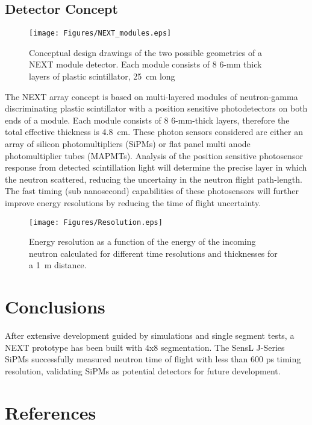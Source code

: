 \documentclass[preprint,3p,twocolumn]{elsarticle}
\begin{document}
\subsection{Detector Concept}

\begin{figure}[tp]
\centering
\texttt{[image: Figures/NEXT\_modules.eps]}
\caption{Conceptual design  drawings of the two possible geometries of a NEXT module detector. Each  module consists of 8 6-mm thick layers of plastic scintillator, 25~cm long}
\label{fig:NEXT_modules}
\end{figure}


The NEXT array concept is based on multi-layered modules of neutron-gamma discriminating plastic scintillator with a position sensitive photodetectors on both ends of a module. Each module consists of 8 6-mm-thick layers, therefore the total effective thickness is 4.8~cm. These photon sensors considered  are either an array of silicon photomultipliers (SiPMs) or flat panel multi anode photomultiplier tubes (MAPMTs). Analysis of the position sensitive photosensor response from detected scintillation light will determine the precise layer in which the neutron scattered, reducing the uncertainy in the neutron flight path-length. The fast timing (sub nanosecond) capabilities of these photosensors will further improve energy resolutions by reducing the time of flight uncertainty. 

\begin{figure}[tb]
\centering
\texttt{[image: Figures/Resolution.eps]}
\caption{Energy resolution as a function of the energy of the incoming neutron calculated for different time resolutions and thicknesses for a 1~m distance.}
\label{fig:resolution}
\end{figure}







\section{Conclusions}
After extensive development guided by simulations and single segment tests, a NEXT prototype has been built with 4x8 segmentation. The SensL\textsuperscript{\texttrademark} J-Series SiPMs successfully measured neutron time of flight with less than 600 ps timing resolution, validating SiPMs as potential detectors for future development.

\section*{References}
%

\end{document}
